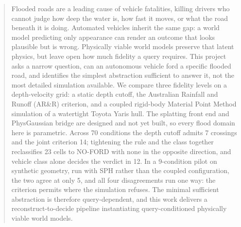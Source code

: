 \documentclass[conference]{IEEEtran}
\begin{document}
%
\begin{abstract}
Flooded roads are a leading cause of vehicle fatalities, killing drivers who cannot judge how deep the water is, how fast it moves, or what the road beneath it is doing. Automated vehicles inherit the same gap: a world model predicting only appearance can render an outcome that looks plausible but is wrong. Physically viable world models preserve that latent physics, but leave open how much fidelity a query requires. This project asks a narrow question, can an autonomous vehicle ford a specific flooded road, and identifies the simplest abstraction sufficient to answer it, not the most detailed simulation available. We compare three fidelity levels on a depth-velocity grid: a static depth cutoff, the Australian Rainfall and Runoff (AR\&R) criterion, and a coupled rigid-body Material Point Method simulation of a watertight Toyota Yaris hull. The splatting front end and PhysGaussian bridge are designed and not yet built, so every flood domain here is parametric. Across 70 conditions the depth cutoff admits 7 crossings and the joint criterion 14; tightening the rule and the class together reclassifies 23 cells to NO-FORD with none in the opposite direction, and vehicle class alone decides the verdict in 12. In a 9-condition pilot on synthetic geometry, run with SPH rather than the coupled configuration, the two agree at only 5, and all four disagreements run one way: the criterion permits where the simulation refuses. The minimal sufficient abstraction is therefore query-dependent, and this work delivers a reconstruct-to-decide pipeline instantiating query-conditioned physically viable world models.
\end{abstract}
\end{document}
